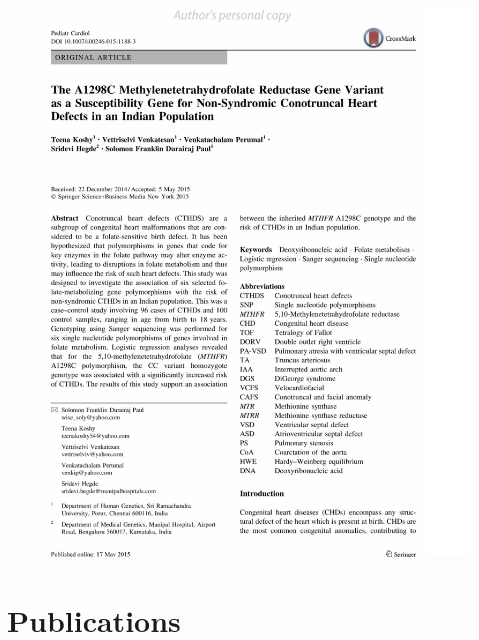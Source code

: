 \begin{figure}[!h]
\includegraphics[width=\linewidth,height=\textheight,keepaspectratio]{Appendices/Pub1.pdf}
\end{figure}



\cleardoublepage
\section*{Publications}

